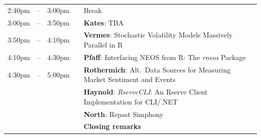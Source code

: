 \documentclass[11pt]{article}
\newcommand{\mylinecolor}[1]{\color{#1}\vspace{-8pt}}  %
\begin{document}
\begin{tabular}{rlrlp{5in}}
   2:40pm & -- & 3:00pm  &   & \small{\mylinecolor{Breaks} Break} \\
   3:00pm & -- & 3:50pm  &   & \textbf{\color{KeynoteTalk} Kates}: \small{TBA} \\
   3:50pm & -- & 4:10pm  &   & \textbf{\color{Talk} Vermes}: \small{Stochastic Volatility Models Massively Parallel in R} \\
   4:10pm & -- & 4:30pm  &   & \textbf{\color{Talk} Pfaff}: \small{Interfacing NEOS from R: The \emph{rneos} Package} \\
   4:30pm & -- & 5:00pm  &   & \textbf{\color{LightningTalk} Rothermich}: \small{Alt.~Data Sources for Measuring Market Sentiment and Events} \\
          &    &        &    & \textbf{\color{LightningTalk} Haynold}: \small{\emph{RserveCLI}: An Rserve Client Implementation for CLI/.NET} \\
          &    &         &   & \textbf{\color{LightningTalk} North}: \small{Repast Simphony} \\
          &    &         &   & \textbf{\color{Breaks} Closing remarks} \\
\end{tabular}
\end{document}

